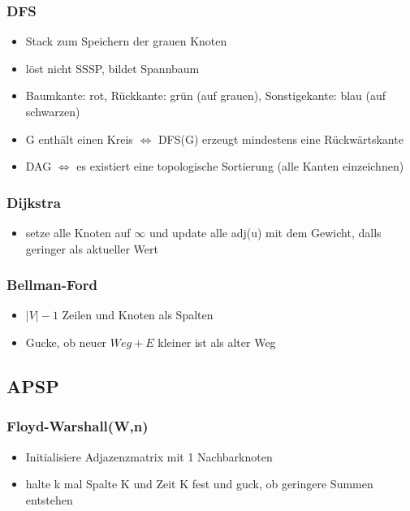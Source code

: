 \documentclass{article}
\begin{document}
\subsubsection{DFS}
\begin{itemize}
\item Stack zum Speichern der grauen Knoten
\item l{\"o}st nicht SSSP, bildet Spannbaum
\item Baumkante: rot, R{\"u}ckkante: gr{\"u}n (auf grauen), Sonstigekante: blau (auf schwarzen)
\item G enth{\"a}lt einen Kreis $\Leftrightarrow$ DFS(G) erzeugt mindestens eine R{\"u}ckw{\"a}rtskante
\item DAG $\Leftrightarrow$ es existiert eine topologische Sortierung (alle Kanten einzeichnen)
\end{itemize}

\subsubsection{Dijkstra}
\begin{itemize}
\item setze alle Knoten auf $\infty$ und update alle adj(u) mit dem Gewicht, dalls geringer als aktueller Wert
\end{itemize}


\subsubsection{Bellman-Ford}
\begin{itemize}
\item $|V|-1$ Zeilen und Knoten als Spalten 
\item Gucke, ob neuer $Weg+E$ kleiner ist als alter Weg
\end{itemize}

\subsection{APSP}
\subsubsection{Floyd-Warshall(W,n)}
\begin{itemize}
\item Initialisiere Adjazenzmatrix mit 1 Nachbarknoten
\item halte k mal Spalte K und Zeit K fest und guck, ob geringere Summen entstehen
\end{itemize}
\end{document}
